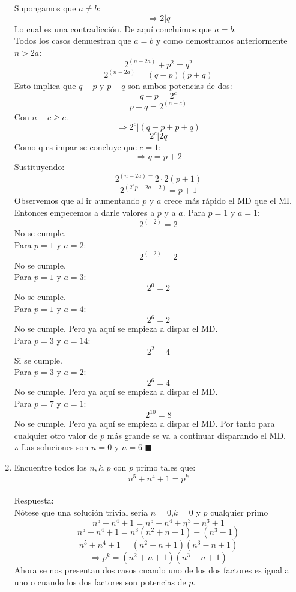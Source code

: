 \documentclass{book}
\begin{document}
\begin{enumerate}
          Supongamos que $a\neq b$:
          $$\Rightarrow 2|q$$
          Lo cual es una contradicción. De aquí concluimos que $a=b$.\\
          Todos los casos demuestran que $a=b$ y como demostramos anteriormente $n>2a$:
          $$2^{(n-2a)}+p^2=q^2$$
          $$2^{(n-2a)}=(q-p)(p+q)$$
          Esto implica que $q-p$ y $p+q$ son ambos potencias de dos:
          $$q-p=2^c$$
          $$p+q=2^{(n-c)}$$
          Con $n-c\geq c$.
          $$\Rightarrow 2^c|(q-p+p+q)$$
          $$2^c|2q$$
          Como q es impar se concluye que $c=1$:
          $$\Rightarrow q=p+2$$
          Sustituyendo:
          $$2^{(n-2a)=}2\cdot 2(p+1)$$
          $$2^{(2^a p-2a-2)}=p+1$$
          Observemos que al ir aumentando $p$ y $a$ crece más rápido el MD que el MI. Entonces empecemos a darle valores a $p$ y a $a$.
          Para $p=1$ y $a=1$:
          $$2^{(-2)}=2$$
          No se cumple.\\
          Para $p=1$ y $a=2$:
          $$2^{(-2)}=2$$
          No se cumple.\\
          Para $p=1$ y $a=3$:
          $$2^0=2$$
          No se cumple.\\
          Para $p=1$ y $a=4$:
          $$2^6=2$$
          No se cumple. Pero ya aquí se empieza a dispar el MD.\\
          Para $p=3$ y $a=14$:
          $$2^2=4$$
          Si se cumple.\\
          Para $p=3$ y $a=2$:
          $$2^6=4$$
          No se cumple. Pero ya aquí se empieza a dispar el MD.\\
          Para $p=7$ y $a=1$:
          $$2^{10}=8$$
          No se cumple. Pero ya aquí se empieza a dispar el MD. Por tanto para cualquier otro valor de $p$ más grande se va a continuar disparando el MD.\\
          $\therefore$ Las soluciones son $n=0$ y $n=6$ $\blacksquare$\\
    \item Encuentre todos los $n,k,p$ con $p$ primo tales que:
          $$n^5+n^4+1=p^k$$\\
          Respuesta:\\
          Nótese que una solución trivial sería $ n=0$,$k=0$  y  $p$ cualquier primo
          $$n^5+n^4+1=n^5+n^4+n^3-n^3+1$$
          $$n^5+n^4+1=n^3 (n^2+n+1)-(n^3-1)$$
          $$n^5+n^4+1=(n^2+n+1)(n^3-n+1)$$
          $$\Rightarrow p^k=(n^2+n+1)(n^3-n+1)$$
          Ahora se nos presentan dos casos cuando uno de los dos factores es igual a uno o cuando los dos factores son potencias de $p$.

\end{enumerate}
\end{document}

